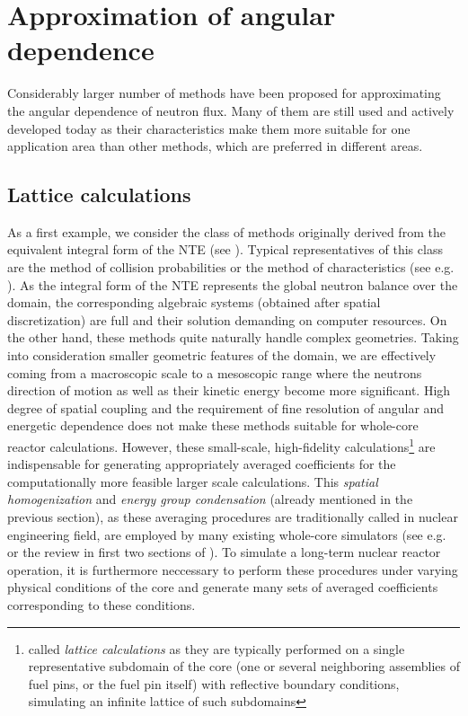 \section{Approximation of angular dependence}

Considerably larger number of methods have been proposed for approximating the angular dependence of neutron
flux. Many of them are still used and actively developed today as their characteristics make them more suitable for one
application area than other methods, which are preferred in different areas.

\subsection{Lattice calculations} \label{sec:lattice}
As a first example, we consider the class of
methods originally derived from the equivalent integral form of the NTE (see ). Typical
representatives of this class are the method of collision probabilities or the method of characteristics (see e.g.
\cite{Cho2,Wu1,Hursin1,Petkov1,Sanchez1}). As the integral form of the NTE represents the global neutron balance over
the domain, the corresponding algebraic systems (obtained after spatial discretization) are full and
their solution demanding on computer resources. On the other hand, these methods quite naturally handle complex
geometries. Taking into consideration smaller geometric features of the domain, we are effectively coming from a
macroscopic scale to a mesoscopic range where the neutrons direction of motion as well as their kinetic energy become
more significant. High degree of spatial coupling and the requirement of fine resolution of angular and energetic
dependence does not make these methods suitable for whole-core reactor calculations.
However, these small-scale,
high-fidelity calculations\footnote{called \textit{lattice calculations} as they are typically performed on a single
representative subdomain of the core (one or several neighboring assemblies of fuel pins, or the fuel pin itself)
with reflective boundary conditions, simulating an infinite lattice of such subdomains} are indispensable for
generating appropriately averaged coefficients for the computationally more feasible larger scale calculations.
This \textit{spatial homogenization} and \textit{energy group condensation} (already mentioned in the previous
section), as these averaging procedures are traditionally called in nuclear engineering field, are employed by many existing whole-core simulators (see e.g.
\cite[Chap. 17]{Reuss1} or the review in first two sections of \cite{Sanchez7}). To simulate a long-term nuclear reactor
operation, it is furthermore neccessary to perform these procedures under varying physical conditions of the core and
generate many sets of averaged coefficients corresponding to these conditions.

